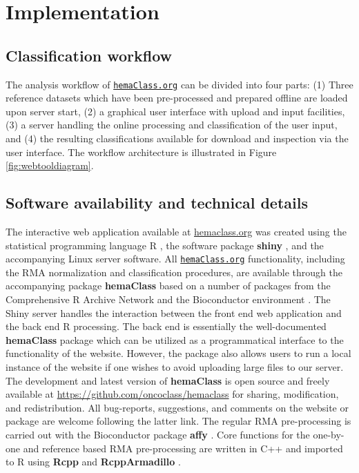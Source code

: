 \documentclass[twocolumn]{bmcart}%
\newcommand{\hemaClass}{\href{http://hemaClass.org}{\texttt{hemaClass.org}}}
\newcommand{\R}{\textsf{R}}
\newcommand{\pkg}[1]{\textbf{#1}}
\begin{document}
\section{Implementation}


\subsection{Classification workflow}
The analysis workflow of \hemaClass{} can be divided into four parts:
(1) Three reference datasets which have been pre-processed and prepared offline are loaded upon server start,
(2) a graphical user interface with upload and input facilities,
(3) a server handling the online processing and classification of the user input, and
(4) the resulting classifications available for download and inspection via the user interface.
The workflow architecture is illustrated in Figure \ref{fig:webtooldiagram}.



\subsection{Software availability and technical details}
The interactive web application available at \url{hemaclass.org} was created using the statistical programming language \R{} \cite{RCoreTeam}, the software package \pkg{shiny} \cite{shiny}, and the accompanying Linux server software.
All \hemaClass{} functionality, including the RMA normalization and classification procedures, are available through the accompanying package \pkg{hemaClass} based on a number of packages from the Comprehensive R Archive Network \cite{RCoreTeam} and the Bioconductor environment \cite{Gentleman2004}.
The Shiny server handles the interaction between the front end web application and the back end \R{} processing.
The back end is essentially the well-documented \pkg{hemaClass} package which can be utilized as a programmatical interface to the functionality of the website.
However, the package also allows users to run a local instance of the website if one wishes to avoid uploading large files to our server.
The development and latest version of \pkg{hemaClass} is open source and freely available at \url{https://github.com/oncoclass/hemaclass} for sharing, modification, and redistribution.
All bug-reports, suggestions, and comments on the website or package are welcome following the latter link.
The regular RMA pre-processing is carried out with the Bioconductor package \pkg{affy} \cite{Gautier2004}.
Core functions for the one-by-one and reference based RMA pre-processing are written in \textsf{C++} and imported to \R{} using \pkg{Rcpp} and \pkg{RcppArmadillo} \cite{Rcpp2013,Eddelbuettel2011,RcppArmadillo,Sanderson2010}.
\end{document}
